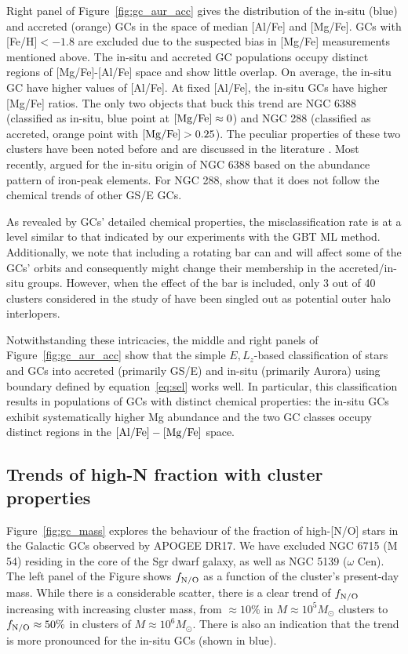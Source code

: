 \documentclass[a4paper,useAMS,usenatbib]{mnras}
\begin{document}
Right panel of Figure~\ref{fig:gc_aur_acc} gives the distribution of the in-situ (blue) and accreted (orange) GCs in the space of median [Al/Fe] and [Mg/Fe]. GCs with [Fe/H]$<-1.8$ are excluded due to the suspected bias in [Mg/Fe] measurements mentioned above. 
The in-situ and accreted GC populations occupy distinct regions of [Mg/Fe]-[Al/Fe] space and show little overlap. On average, the in-situ GC have higher values of [Al/Fe]. At fixed [Al/Fe], the in-situ GCs have higher [Mg/Fe] ratios. The only two objects that buck this trend are NGC 6388 (classified as in-situ, blue point at $\rm [Mg/Fe]\approx0$) and NGC 288 (classified as accreted, orange point with $\rm [Mg/Fe]>0.25$). The peculiar properties of these two clusters have been noted before and are discussed in the literature \citep[see e.g.][]{Myeong2019, Massari2019, Horta_GC}. Most recently, \citet{Carretta2022} argued for the in-situ origin of NGC 6388 based on the abundance pattern of iron-peak elements. For NGC 288, \citet{Monty2023} show that it does not follow the chemical trends of other GS/E GCs.

As revealed by GCs' detailed chemical properties, the misclassification rate is at a level similar to that indicated by our experiments with the GBT ML method. Additionally, we note that including a rotating bar can and will affect some of the GCs' orbits and consequently might change their membership in the accreted/in-situ groups. However, when the effect of the bar is included, only 3 out of 40 clusters considered in the study of \citet{Perez2020} have been singled out as potential outer halo interlopers. 

Notwithstanding these intricacies, the middle and right panels of Figure~\ref{fig:gc_aur_acc} show that the simple $E,L_z$-based classification of stars and GCs into accreted (primarily GS/E) and in-situ (primarily Aurora) using boundary defined by equation~\ref{eq:sel} works well. In particular, this classification results in populations of GCs with distinct chemical properties:  
the in-situ GCs exhibit systematically higher Mg abundance and the two GC classes occupy distinct regions in the $\rm [Al/Fe]-[Mg/Fe]$ space. 

\subsection{Trends of high-N fraction with cluster properties}
\label{sec:trends}

Figure~\ref{fig:gc_mass} explores the behaviour of the fraction of high-[N/O] stars in the Galactic GCs observed by APOGEE DR17. We have excluded NGC 6715 (M 54) residing in the core of the Sgr dwarf galaxy, as well as NGC 5139 ($\omega$ Cen). The left panel of the Figure shows $f_{\rm N/O}$ as a function of the cluster's present-day mass. While there is a considerable scatter, there is a clear trend of $f_{\rm N/O}$ increasing with increasing cluster mass, from $\approx 10\%$ in  $M\approx10^5 M_{\odot}$ clusters to $f_{\rm N/O}\approx50\%$ in clusters of $M\approx10^6 M_{\odot}$. There is also an indication that the trend is more pronounced for the in-situ GCs (shown in blue). 
\end{document}
